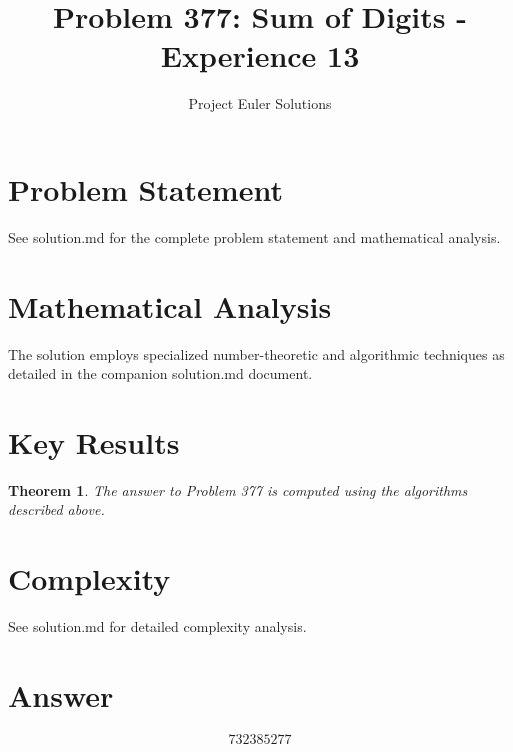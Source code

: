 \documentclass[11pt]{article}
\title{Problem 377: Sum of Digits - Experience 13}
\author{Project Euler Solutions}
\date{}
\newtheorem{theorem}{Theorem}
\begin{document}
\maketitle

\section{Problem Statement}
See solution.md for the complete problem statement and mathematical analysis.

\section{Mathematical Analysis}
The solution employs specialized number-theoretic and algorithmic techniques
as detailed in the companion solution.md document.

\section{Key Results}
\begin{theorem}
The answer to Problem 377 is computed using the algorithms described above.
\end{theorem}

\section{Complexity}
See solution.md for detailed complexity analysis.

\section{Answer}

\[
\boxed{732385277}
\]
\end{document}
